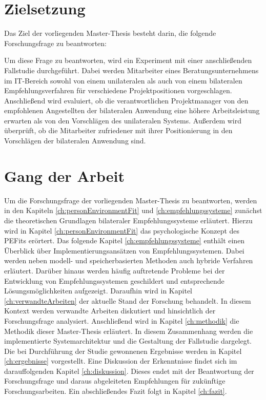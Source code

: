 \newpage
\section{Zielsetzung}
\label{sec:intro:zielsetzung}
Das Ziel der vorliegenden Master-Thesis besteht darin, die folgende Forschungsfrage zu beantworten:

\forschungsfrage

Um diese Frage zu beantworten, wird ein Experiment mit einer anschließenden Fallstudie durchgeführt. Dabei werden Mitarbeiter eines Beratungsunternehmens im IT-Bereich sowohl von einem unilateralen als auch von einem bilateralen Empfehlungsverfahren für verschiedene Projektpositionen vorgeschlagen. Anschließend wird evaluiert, ob die verantwortlichen Projektmanager von den empfohlenen Angestellten der bilateralen Anwendung eine höhere Arbeitsleistung erwarten als von den Vorschlägen des unilateralen Systems. Außerdem wird überprüft, ob die Mitarbeiter zufriedener mit ihrer Positionierung in den Vorschlägen der bilateralen Anwendung sind.

\section{Gang der Arbeit}
\label{sec:intro:gangDerArbeit}
Um die Forschungsfrage der vorliegenden Master-Thesis zu beantworten, werden in den Kapiteln \ref{ch:personEnvironmentFit} und \ref{ch:empfehlungssysteme} zunächst die theoretischen Grundlagen bilateraler Empfehlungssysteme erläutert. Hierzu wird in Kapitel \ref{ch:personEnvironmentFit} das psychologische Konzept des \acp{PEFit} erörtert. Das folgende Kapitel \ref{ch:empfehlungssysteme} enthält einen Überblick über Implementierungsansätzen von Empfehlungssystemen. Dabei werden neben modell- und speicherbasierten Methoden auch hybride Verfahren erläutert. Darüber hinaus werden häufig auftretende Probleme bei der Entwicklung von Empfehlungssystemen geschildert und entsprechende Lösungsmöglichkeiten aufgezeigt. Daraufhin wird in Kapitel \ref{ch:verwandteArbeiten} der aktuelle Stand der Forschung behandelt. In diesem Kontext werden verwandte Arbeiten diskutiert und hinsichtlich der Forschungsfrage analysiert. Anschließend wird in Kapitel \ref{ch:methodik} die Methodik dieser Master-Thesis erläutert. In diesem Zusammenhang werden die implementierte Systemarchitektur und die Gestaltung der Fallstudie dargelegt. Die bei Durchführung der Studie gewonnenen Ergebnisse werden in Kapitel \ref{ch:ergebnisse} vorgestellt. Eine Diskussion der Erkenntnisse findet sich im darauffolgenden Kapitel \ref{ch:diskussion}. Dieses endet mit der Beantwortung der Forschungsfrage und daraus abgeleiteten Empfehlungen für zukünftige Forschungsarbeiten. Ein abschließendes Fazit folgt in Kapitel \ref{ch:fazit}.
